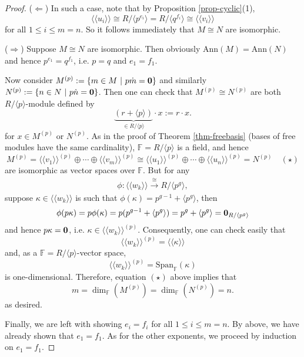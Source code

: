 \documentclass[11pt,openany]{book}
\theoremstyle{plain}
\theoremstyle{definition}
\theoremstyle{remark}
\begin{document}
\begin{proof}
    ($\Leftarrow$) In such a case, note that by Proposition \ref{prop-cyclic}(1), 
    $$\langle\langle u_i\rangle\rangle \cong R/\langle p^{e_i} \rangle = R/\langle q^{f_i} \rangle \cong \langle\langle v_i\rangle\rangle$$
    for all $1 \leq i \leq m = n$. So it follows immediately that $M \cong N$ are isomorphic.
    
    ($\Rightarrow$) Suppose $M \cong N$ are isomorphic. Then obviously $\mathrm{Ann}(M) = \mathrm{Ann}(N)$
    and hence $p^{e_1} = q^{f_1}$, i.e. $p = q$ and $e_1 = f_1$.

    Now consider $M^{(p)} := \{m \in M\ |\ p \dot m = {\bf 0}\}$ and similarly $N^{(p)} := \{n \in N\ |\ p \dot n = {\bf 0}\}$. Then one can check that
    $M^{(p)} \cong N^{(p)}$ are both $R/\langle p \rangle$-module defined by
    $$\underbrace{(r + \langle p \rangle)}_{\in R/\langle p \rangle} \cdot x := r\cdot x.$$
    for $x \in M^{(p)}$ or $N^{(p)}$. As in the proof of Theorem \ref{thm-freebasis} (bases of free modules have the same cardinality), $\mathbb{F} = R/\langle p \rangle$ is a field, and hence
    $$M^{(p)} = \langle\langle v_1\rangle\rangle^{(p)} \oplus\cdots\oplus\langle\langle v_m\rangle\rangle^{(p)} \cong \langle\langle u_1\rangle\rangle^{(p)} \oplus\cdots\oplus\langle\langle u_n\rangle\rangle^{(p)} = N^{(p)} \quad (\star)$$
are isomorphic as vector spaces over $\mathbb{F}$. But for any 
\begin{align*}
\phi: \langle \langle w_k \rangle \rangle \xrightarrow{\cong} R/\langle p^{g} \rangle, 
\end{align*}
suppose $\kappa \in \langle \langle w_k \rangle \rangle$
is such that 
$\phi(\kappa) = p^{g-1} + \langle p^{g} \rangle$, then 
$$\phi(p\kappa) = p \phi(\kappa) = p(p^{g-1} + \langle p^{g} \rangle) = p^g + \langle p^{g} \rangle = {\bf 0}_{R/\langle p^{g} \rangle}$$
and hence $p\kappa = {\bf 0}$, i.e. $\kappa \in \langle \langle w_k \rangle \rangle^{(p)}$. Consequently, one can check easily that
$$\langle\langle w_k \rangle\rangle^{(p)} = \langle\langle \kappa \rangle\rangle$$
and, as a $\mathbb{F} = R/\langle p \rangle$-vector space, 
$$\langle\langle w_k \rangle\rangle^{(p)} = \mathrm{Span}_{\mathbb{F}}(\kappa)$$
is one-dimensional. Therefore, equation $(\star)$ above implies that 
$$m = \dim_{\mathbb{F}}(M^{(p)}) = \dim_{\mathbb{F}}(N^{(p)}) = n.$$ 
as desired.

Finally, we are left with showing $e_i = f_i$ for all $1 \leq i \leq m = n$. By above, we have already shown that $e_1 = f_1$. As for the other exponents, we proceed by induction on $e_1 = f_1$.


\end{proof}
\end{document}
